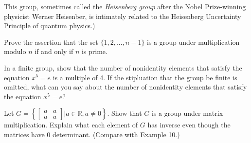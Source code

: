 \documentclass[11pt,largemargins]{homework}
\begin{document}
This group, sometimes called the \textit{Heisenberg group} after the Nobel Prize-winning physicist Werner Heisenber, 
is intimately related to the Heisenberg Uncertainty Principle of quantum physics.)

\question 
Prove the assertion that the set $\{1,2,...,n-1\}$ is a group under multiplication modulo $n$ if and only if $n$ is 
prime.

\question 
In a finite group, show that the number of nonidentity elements that satisfy the equation $x^5=e$ is a multiple of 4. 
If the stipluation that the group be finite is omitted, what can you say about the number of nonidentity elements 
that satisfy the equation $x^5=e$?

\question 
Let $G=\left\{
\begin{bmatrix} 
    a & a \\ 
    a & a 
\end{bmatrix} | a \in \mathbb{R}, a \neq 0 \right\}$.
Show that $G$ is a group under matrix multiplication. Explain what each element of $G$ has inverse even though the matrices 
have 0 determinant. (Compare with Example 10.)
\end{document}
